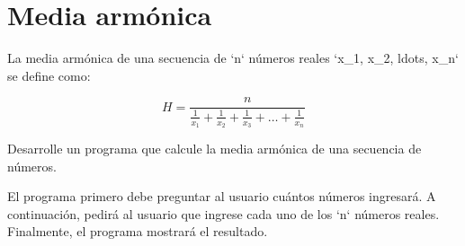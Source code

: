 \section{Media armónica}

La media armónica de una secuencia de `n` números reales `x\_1, x\_2,
ldots, x\_n` se deﬁne como:

\[H = \frac{n}{\frac{1}{x_1} + \frac{1}{x_2} + \frac{1}{x_3} + \ldots + \frac{1}{x_n}}\]

Desarrolle un programa que calcule la media armónica de una secuencia de
números.

El programa primero debe preguntar al usuario cuántos números ingresará.
A continuación, pedirá al usuario que ingrese cada uno de los `n`
números reales. Finalmente, el programa mostrará el resultado.
